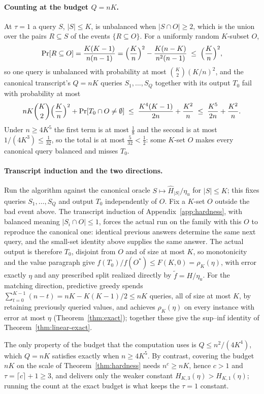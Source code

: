 \paragraph{Counting at the budget $Q=nK$.}
At $\tau=1$ a query $S$, $|S|\le K$, is unbalanced when $|S\cap O|\ge2$,
which is the union over the pairs $R\subseteq S$ of the events
$\{R\subseteq O\}$.  For a uniformly random $K$-subset $O$,
\[
  \Pr[R\subseteq O]=\frac{K(K-1)}{n(n-1)}
  =\Bigl(\frac Kn\Bigr)^{2}-\frac{K(n-K)}{n^{2}(n-1)}
  \;\le\;\Bigl(\frac Kn\Bigr)^{2},
\]
so one query is unbalanced with probability at most
$\binom K2(K/n)^{2}$, and the canonical transcript's $Q=nK$ queries
$S_1,\dots,S_Q$ together with its output $T_0$ fail with probability at most
\[
  nK\binom K2\Bigl(\frac Kn\Bigr)^{2}+\Pr[T_0\cap O\ne\emptyset]
  \;\le\;\frac{K^{4}(K-1)}{2n}+\frac{K^{2}}{n}
  \;\le\;\frac{K^{5}}{2n}+\frac{K^{2}}{n}.
\]
Under $n\ge4K^{5}$ the first term is at most $\tfrac18$ and the second is at
most $1/(4K^{3})\le\tfrac1{32}$, so the total is at most
$\tfrac5{32}<\tfrac12$: some $K$-set $O$ makes every canonical query
balanced and misses $T_0$.

\paragraph{Transcript induction and the two directions.}
Run the algorithm against the canonical oracle
$S\mapsto\widehat H_{|S|}/\eta_u$ for $|S|\le K$; this fixes queries
$S_1,\dots,S_Q$ and output $T_0$ independently of $O$.  Fix a $K$-set $O$
outside the bad event above.  The transcript induction of
Appendix~\ref{app:hardness}, with balanced meaning $|S_i\cap O|\le1$,
forces the actual run on the family with this $O$ to reproduce the
canonical one: identical previous answers determine the same next query,
and the small-set identity above supplies the same answer.  The actual
output is therefore $T_0$, disjoint from $O$ and of size at most $K$, so
monotonicity and the value paragraph give
$f(T_0)/f(O^{\ast})\le F(K,0)=\rho_K(\eta)$, with error exactly $\eta$
and any prescribed split realized directly by $\tilde f=H/\eta_u$.  For
the matching direction, predictive greedy spends
$\sum_{t=0}^{K-1}(n-t)=nK-K(K-1)/2\le nK$ queries, all of size at most
$K$, by retaining previously queried values, and achieves
$\rho_K(\eta)$ on every instance with error at most $\eta$
(Theorem~\ref{thm:exact}); together these give the sup--inf identity of
Theorem~\ref{thm:linear-exact}.

The only property of the budget that the computation uses is
$Q\le n^{2}/(4K^{4})$, which $Q=nK$ satisfies exactly when $n\ge4K^{5}$.
By contrast, covering the budget $nK$ on the scale of
Theorem~\ref{thm:hardness} needs $n^{c}\ge nK$, hence $c>1$ and
$\tau=\lceil c\rceil+1\ge3$, and delivers only the weaker constant
$H_{K,3}(\eta)>H_{K,1}(\eta)$; running the count at the exact budget is what
keeps the $\tau=1$ constant.


